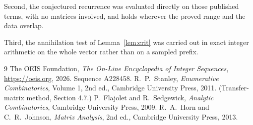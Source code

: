 \documentclass[11pt,a4paper]{article}
\theoremstyle{plain}
\theoremstyle{definition}
\begin{document}
Second, the conjectured recurrence was evaluated directly on those published terms, with no
matrices involved, and holds wherever the proved range and the data overlap.

Third, the annihilation test of Lemma~\ref{lem:crit} was carried out in exact integer
arithmetic on the whole vector rather than on a sampled prefix.

\begin{thebibliography}{9}
 The OEIS Foundation, \emph{The On-Line Encyclopedia of Integer
Sequences}, \url{https://oeis.org}, 2026. Sequence A228458.
 R.~P.~Stanley, \emph{Enumerative Combinatorics}, Volume 1, 2nd ed.,
Cambridge University Press, 2011. (Transfer-matrix method, Section 4.7.)
 P.~Flajolet and R.~Sedgewick, \emph{Analytic Combinatorics}, Cambridge
University Press, 2009.
 R.~A.~Horn and C.~R.~Johnson, \emph{Matrix Analysis}, 2nd ed., Cambridge
University Press, 2013.
\end{thebibliography}
\end{document}
